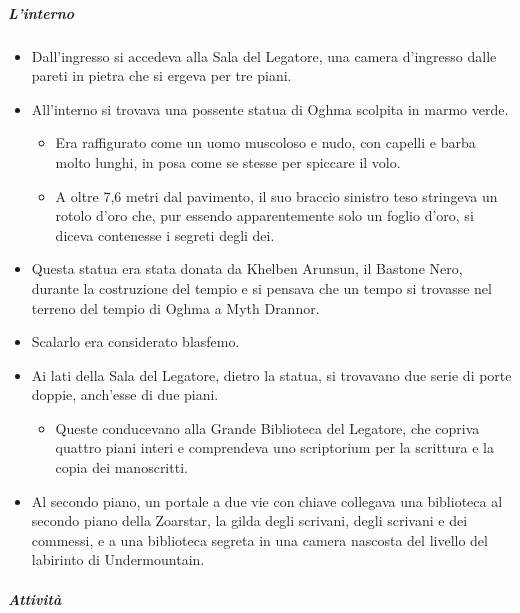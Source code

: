\documentclass{article}
\begin{document}
              \subparagraph{L'interno}
              \begin{itemize}
                \item Dall'ingresso si accedeva alla Sala del Legatore, una camera d'ingresso dalle pareti in pietra che si ergeva per tre piani.
                \item All'interno si trovava una possente statua di Oghma scolpita in marmo verde.
                \begin{itemize}
                    \item Era raffigurato come un uomo muscoloso e nudo, con capelli e barba molto lunghi, in posa come se stesse per spiccare il volo.
                    \item A oltre 7,6 metri dal pavimento, il suo braccio sinistro teso stringeva un rotolo d'oro che, pur essendo apparentemente solo un foglio d'oro, si diceva contenesse i segreti degli dei.
                \end{itemize}
                \item Questa statua era stata donata da Khelben Arunsun, il Bastone Nero, durante la costruzione del tempio e si pensava che un tempo si trovasse nel terreno del tempio di Oghma a Myth Drannor.
                \item Scalarlo era considerato blasfemo.
                \item Ai lati della Sala del Legatore, dietro la statua, si trovavano due serie di porte doppie, anch'esse di due piani.
                \begin{itemize}
                    \item Queste conducevano alla Grande Biblioteca del Legatore, che copriva quattro piani interi e comprendeva uno scriptorium per la scrittura e la copia dei manoscritti.
                \end{itemize}
                \item Al secondo piano, un portale a due vie con chiave collegava una biblioteca al secondo piano della Zoarstar, la gilda degli scrivani, degli scrivani e dei commessi, e a una biblioteca segreta in una camera nascosta del livello del labirinto di Undermountain.
            \end{itemize}
              \subparagraph{Attività}
\end{document}
